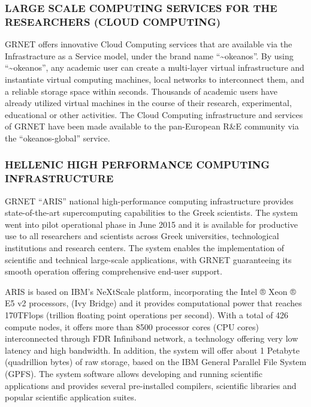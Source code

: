 \subsubsection{LARGE SCALE COMPUTING SERVICES FOR THE RESEARCHERS (CLOUD COMPUTING)}
GRNET offers innovative Cloud Computing services
that are available via the Infrastracture as a Service model,
under the brand name “\textasciitilde okeanos”.
By using “\textasciitilde okeanos”,
any academic user can create a multi-layer virtual infrastructure
and instantiate virtual computing machines,
local networks to interconnect them,
and a reliable storage space within seconds.
Thousands of academic users have already utilized virtual machines
in the course of their research, experimental, educational or other activities.
The Cloud Computing infrastructure and services of GRNET
have been made available to the pan-European R\&E community
via the “okeanos-global” service.

\subsubsection{HELLENIC HIGH PERFORMANCE COMPUTING INFRASTRUCTURE}
GRNET “ARIS” national high-performance computing infrastructure
provides state-of-the-art supercomputing capabilities
to the Greek scientists.
The system went into pilot operational phase in June 2015
and it is available for productive use
to all researchers and scientists across
Greek universities, technological institutions and research centers.
The system enables the implementation of scientific
and technical large-scale applications,
with GRNET guaranteeing its smooth operation
offering comprehensive end-user support.\par

ARIS is based on IBM’s NeXtScale platform,
incorporating the Intel ® Xeon ® E5 v2 processors,
(Ivy Bridge) and it provides computational power
that reaches 170TFlops (trillion floating point operations per second).
With a total of 426 compute nodes,
it offers more than 8500 processor cores (CPU cores)
interconnected through FDR Infiniband network,
a technology offering very low latency and high bandwidth.
In addition, the system will offer about
1 Petabyte (quadrillion bytes) of raw storage,
based on the IBM General Parallel File System (GPFS).
The system software allows developing
and running scientific applications
and provides several pre-installed compilers,
scientific libraries and popular scientific application suites.

